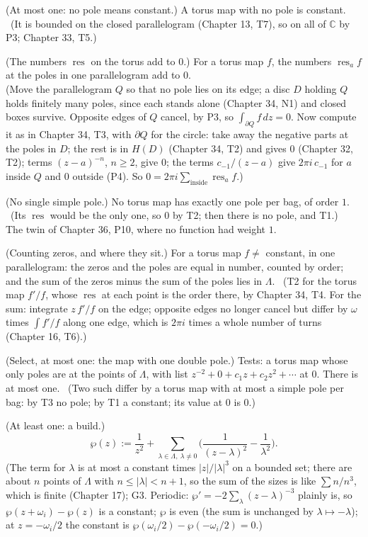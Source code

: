 \begin{lines}
\item[\lab{T1}] (At most one: no pole means constant.) A torus map with no pole is constant. \ (It is bounded on the closed parallelogram (Chapter 13, T7), so on all of $\mathbb{C}$ by P3; Chapter 33, T5.)
\item[\lab{T2}] (The numbers $\operatorname{res}$ on the torus add to $0$.) For a torus map $f$, the numbers $\operatorname{res}_a f$ at the poles in one parallelogram add to $0$. \\ (Move the parallelogram $Q$ so that no pole lies on its edge; a disc $D$ holding $Q$ holds finitely many poles, since each stands alone (Chapter 34, N1) and closed boxes survive. Opposite edges of $Q$ cancel, by P3, so $\int_{\partial Q} f\,dz = 0$. Now compute it as in Chapter 34, T3, with $\partial Q$ for the circle: take away the negative parts at the poles in $D$; the rest is in $H(D)$ (Chapter 34, T2) and gives $0$ (Chapter 32, T2); terms $(z - a)^{-n}$, $n \ge 2$, give $0$; the terms $c_{-1}/(z - a)$ give $2\pi i\,c_{-1}$ for $a$ inside $Q$ and $0$ outside (P4). So $0 = 2\pi i \sum_{\text{inside}} \operatorname{res}_a f$.)
\item[\lab{T3}] (No single simple pole.) No torus map has exactly one pole per bag, of order $1$. \ (Its $\operatorname{res}$ would be the only one, so $0$ by T2; then there is no pole, and T1.) \\
The twin of Chapter 36, P10, where no function had weight $1$.
\item[\lab{T4}] (Counting zeros, and where they sit.) For a torus map $f \ne$ constant, in one parallelogram: the zeros and the poles are equal in number, counted by order; and the sum of the zeros minus the sum of the poles lies in $\Lambda$. \ (T2 for the torus map $f'/f$, whose $\operatorname{res}$ at each point is the order there, by Chapter 34, T4. For the sum: integrate $z\, f'/f$ on the edge; opposite edges no longer cancel but differ by $\omega$ times $\int f'/f$ along one edge, which is $2\pi i$ times a whole number of turns (Chapter 16, T6).)
\item[\lab{T5}] (Select, at most one: the map with one double pole.) Tests: a torus map whose only poles are at the points of $\Lambda$, with list $z^{-2} + 0 + c_1 z + c_2 z^2 + \cdots$ at $0$. There is at most one. \ (Two such differ by a torus map with at most a simple pole per bag: by T3 no pole; by T1 a constant; its value at $0$ is $0$.)
\item[\lab{T6}] (At least one: a build.) \[ \wp(z) := \frac{1}{z^2} + \sum_{\lambda \in \Lambda,\ \lambda \ne 0} \Big( \frac{1}{(z - \lambda)^2} - \frac{1}{\lambda^2} \Big). \] (The term for $\lambda$ is at most a constant times $|z| / |\lambda|^3$ on a bounded set; there are about $n$ points of $\Lambda$ with $n \le |\lambda| < n + 1$, so the sum of the sizes is like $\sum n / n^3$, which is finite (Chapter 17); G3. Periodic: $\wp' = -2 \sum_{\lambda} (z - \lambda)^{-3}$ plainly is, so $\wp(z + \omega_i) - \wp(z)$ is a constant; $\wp$ is even (the sum is unchanged by $\lambda \mapsto -\lambda$); at $z = -\omega_i / 2$ the constant is $\wp(\omega_i/2) - \wp(-\omega_i/2) = 0$.) \\

\end{lines}
